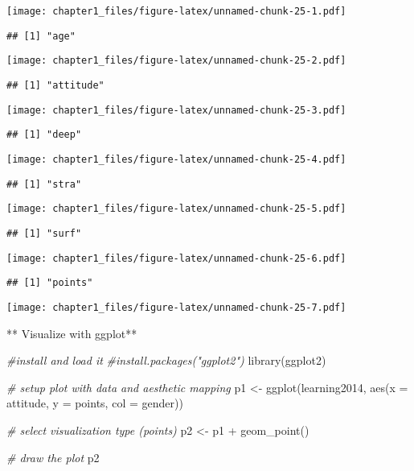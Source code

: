 \documentclass[
]{article}
\newenvironment{Shaded}{\begin{snugshade}}{\end{snugshade}}
\newcommand{\AttributeTok}[1]{\textcolor[rgb]{0.77,0.63,0.00}{#1}}
\newcommand{\CommentTok}[1]{\textcolor[rgb]{0.56,0.35,0.01}{\textit{#1}}}
\newcommand{\FunctionTok}[1]{\textcolor[rgb]{0.00,0.00,0.00}{#1}}
\newcommand{\NormalTok}[1]{#1}
\newcommand{\OtherTok}[1]{\textcolor[rgb]{0.56,0.35,0.01}{#1}}
\newcommand{\SpecialCharTok}[1]{\textcolor[rgb]{0.00,0.00,0.00}{#1}}
\begin{document}
\texttt{[image: chapter1\_files/figure-latex/unnamed-chunk-25-1.pdf]}

\begin{verbatim}
## [1] "age"
\end{verbatim}

\texttt{[image: chapter1\_files/figure-latex/unnamed-chunk-25-2.pdf]}

\begin{verbatim}
## [1] "attitude"
\end{verbatim}

\texttt{[image: chapter1\_files/figure-latex/unnamed-chunk-25-3.pdf]}

\begin{verbatim}
## [1] "deep"
\end{verbatim}

\texttt{[image: chapter1\_files/figure-latex/unnamed-chunk-25-4.pdf]}

\begin{verbatim}
## [1] "stra"
\end{verbatim}

\texttt{[image: chapter1\_files/figure-latex/unnamed-chunk-25-5.pdf]}

\begin{verbatim}
## [1] "surf"
\end{verbatim}

\texttt{[image: chapter1\_files/figure-latex/unnamed-chunk-25-6.pdf]}

\begin{verbatim}
## [1] "points"
\end{verbatim}

\texttt{[image: chapter1\_files/figure-latex/unnamed-chunk-25-7.pdf]}

** Visualize with ggplot**

\begin{Shaded}
\begin{Highlighting}[]
\CommentTok{\#install and load it}
\CommentTok{\#install.packages("ggplot2")}
\FunctionTok{library}\NormalTok{(ggplot2)}

\CommentTok{\# setup plot with data and aesthetic mapping}
\NormalTok{p1 }\OtherTok{\textless{}{-}} \FunctionTok{ggplot}\NormalTok{(learning2014, }\FunctionTok{aes}\NormalTok{(}\AttributeTok{x =}\NormalTok{ attitude, }\AttributeTok{y =}\NormalTok{ points, }\AttributeTok{col =}\NormalTok{ gender))}

\CommentTok{\# select visualization type (points)}
\NormalTok{p2 }\OtherTok{\textless{}{-}}\NormalTok{ p1 }\SpecialCharTok{+} \FunctionTok{geom\_point}\NormalTok{()}

\CommentTok{\# draw the plot}
\NormalTok{p2}
\end{Highlighting}
\end{Shaded}
\end{document}
